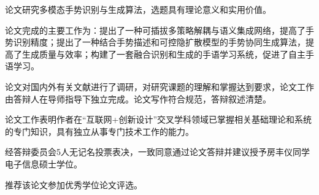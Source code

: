 
\begin{resolution}








  论文研究多模态手势识别与生成算法，选题具有理论意义和实用价值。

  论文完成的主要工作为：提出了一种可插拔多策略解耦与语义集成网络，提高了手势识别精度；提出了一种结合手势描述和可控隐扩散模型的手势协同生成算法，提高了生成质量与效率；构建了一套融合识别和生成的手语学习系统，促进了自主手语学习。

  论文对国内外有关文献进行了调研，对研究课题的理解和掌握达到要求，论文工作由答辩人在导师指导下独立完成。论文写作符合规范，答辩叙述清楚。
  
  论文工作表明作者在“互联网+创新设计”交叉学科领域已掌握相关基础理论和系统的专门知识，具有独立从事专门技术工作的能力。

  经答辩委员会5人无记名投票表决，一致同意通过论文答辩并建议授予房丰仪同学电子信息硕士学位。
  
  推荐该论文参加优秀学位论文评选。
  
\end{resolution}

